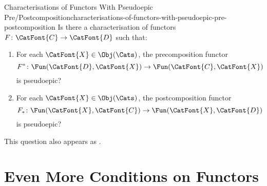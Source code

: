 \begin{question}{Characterisations of Functors With Pseudoepic Pre/Postcomposition}{characterisations-of-functors-with-pseudoepic-pre-postcomposition}%
    Is there a characterisation of functors $F\colon\CatFont{C}\to\CatFont{D}$ such that:
    \begin{enumerate}
        \item\label{characterisations-of-functors-with-pseudoepic-pre-postcomposition-a}For each $\CatFont{X}\in\Obj(\Cats)$, the precomposition functor
            \[
                F^{*}%
                \colon%
                \Fun(\CatFont{D},\CatFont{X})%
                \to%
                \Fun(\CatFont{C},\CatFont{X})%
            \]%
            is pseudoepic?
        \item\label{characterisations-of-functors-with-pseudoepic-pre-postcomposition-b}For each $\CatFont{X}\in\Obj(\Cats)$, the postcomposition functor
            \[
                F_{*}%
                \colon%
                \Fun(\CatFont{X},\CatFont{C})%
                \to%
                \Fun(\CatFont{X},\CatFont{D})%
            \]%
            is pseudoepic?
    \end{enumerate}
    This question also appears as \cite{MO468125}.
\end{question}
\section{Even More Conditions on Functors}\label{section-even-more-conditions-on-functors}
